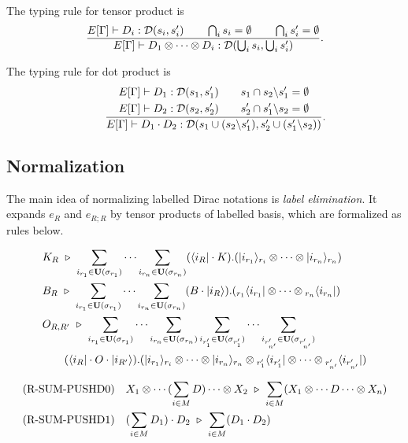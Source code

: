 The typing rule for tensor product is
\[
    \frac{
        E[\Gamma] \vdash D_i : \mathcal{D}(s_i,s_i') \qquad
        \bigcap_i s_i = \emptyset \qquad
        \bigcap_i s_i' = \emptyset
    }
    {E[\Gamma] \vdash D_1 \otimes \cdots \otimes D_i : \mathcal{D}(\bigcup_i s_i, \bigcup_i s_i')}.
\]

The typing rule for dot product is
\[
    \qquad
    \frac{
        \begin{aligned}
            E[\Gamma] \vdash D_1 : \mathcal{D}(s_1,s_1') \\
            E[\Gamma] \vdash D_2 : \mathcal{D}(s_2,s_2')
        \end{aligned}
        \qquad 
        \begin{aligned}
            s_1 \cap s_2 \backslash s_1' = \emptyset \\
            s_2' \cap s_1' \backslash s_2 = \emptyset
        \end{aligned}
    }
    {E[\Gamma] \vdash D_1\cdot D_2 : \mathcal{D}(s_1 \cup (s_2\backslash s_1'), s_2' \cup (s_1'\backslash s_2))}.
\]

\subsection{Normalization}
The main idea of normalizing labelled Dirac notations is \textit{label elimination}. It expands $e_R$ and $e_{R;R}$ by tensor products of labelled basis, which are formalized as rules below.

\begin{align*}
    & K_R \ \triangleright\ \sum_{i_{r_1}\in\mathbf{U}(\sigma_{r_1})}\cdots \sum_{i_{r_n}\in\mathbf{U}(\sigma_{r_n})} (\langle i_R|\cdot K). (|i_{r_1}\rangle_{r_i}\otimes\cdots\otimes|i_{r_n}\rangle_{r_n}) \\
    & B_R \ \triangleright\ \sum_{i_{r_1}\in\mathbf{U}(\sigma_{r_1})}\cdots \sum_{i_{r_n}\in\mathbf{U}(\sigma_{r_n})} (B\cdot |i_R\rangle). ({}_{r_1}\langle i_{r_1}|\otimes\cdots\otimes{}_{r_n}\langle i_{r_n}|) \\
    & O_{R,R'} \ \triangleright\ \sum_{i_{r_1}\in\mathbf{U}(\sigma_{r_1})}\cdots \sum_{i_{r_n}\in\mathbf{U}(\sigma_{r_n})}
    \sum_{i_{r'_1}\in\mathbf{U}(\sigma_{r'_1})}\cdots \sum_{i_{r'_{n'}}\in\mathbf{U}(\sigma_{r'_{n'}})} \\
    & \qquad (\langle i_R|\cdot O\cdot |i_{R'}\rangle).(|i_{r_1}\rangle_{r_i}\otimes\cdots\otimes|i_{r_n}\rangle_{r_n} \otimes {}_{r'_1}\langle i_{r'_1}|\otimes\cdots\otimes{}_{r'_{n'}}\langle i_{r'_{n'}}|)
\end{align*}

\begin{align*}
    & \textrm{(R-SUM-PUSHD0)}
    && X_1 \otimes \cdots (\sum_{i \in M} D) \cdots \otimes X_2\ \triangleright\ \sum_{i \in M} (X_1 \otimes \cdots D \cdots \otimes X_n) \\
    & \textrm{(R-SUM-PUSHD1)}
    && (\sum_{i \in M} D_1) \cdot D_2 \ \triangleright\ \sum_{i \in M} (D_1 \cdot D_2) \\
\end{align*}


